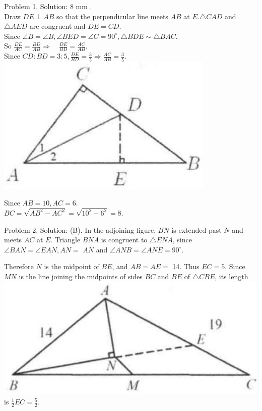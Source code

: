 \documentclass[10pt]{article}
\begin{document}
Problem 1. Solution: 8 mm .\\
Draw \(D E \perp A B\) so that the perpendicular line meets \(A B\) at \(E . \triangle C A D\) and \(\triangle A E D\) are congruent and \(D E=C D\).\\
Since \(\angle B=\angle B, \angle B E D=\angle C=90^{\circ}, \triangle B D E \sim \triangle B A C\).\\
So \(\frac{D E}{A C}=\frac{B D}{A B} \Rightarrow \quad \frac{D E}{B D}=\frac{A C}{A B}\).\\
Since \(C D: B D=3: 5, \frac{D E}{B D}=\frac{3}{5} \Rightarrow \frac{A C}{A B}=\frac{3}{5}\).\\
\includegraphics[max width=\textwidth, center]{2025_04_17_97bc1f7e44d93c271a88g-067}

Since \(A B=10, A C=6\).\\
\(B C=\sqrt{A B^{2}-A C^{2}}=\sqrt{10^{2}-6^{2}}=8\).

Problem 2. Solution: (B).
In the adjoining figure, \(B N\) is extended past \(N\) and meets \(A C\) at \(E\). Triangle \(B N A\) is congruent to \(\triangle E N A\), since \(\angle B A N=\angle E A N, A N=\) \(A N\) and \(\angle A N B=\angle A N E=90^{\circ}\).

Therefore \(N\) is the midpoint of \(B E\), and \(A B=A E=\) 14. Thus \(E C=5\). Since \(M N\) is the line joining the midpoints of sides \(B C\) and \(B E\) of \(\triangle C B E\), its length\\
\includegraphics[max width=\textwidth]{2025_04_17_97bc1f7e44d93c271a88g-067(2)} is \(\frac{1}{2} E C=\frac{5}{2}\).
\end{document}

